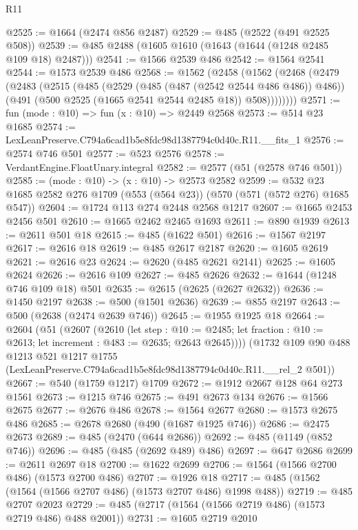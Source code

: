 \begin{lexlean}{R11}
\begin{coremodule}
@2525 := @1664 (@2474 @856 @2487)
@2529 := @485 (@2522 (@491 @2525 @508))
@2539 := @485 @2488 (@1605 @1610 (@1643 (@1644 (@1248 @2485 @109 @18) @2487)))
@2541 := @1566 @2539 @486
@2542 := @1564 @2541
@2544 := @1573 @2539 @486
@2568 := @1562
    (@2458
      (@1562
        (@2468
          (@2479
            (@2483
              (@2515
                (@485
                  (@2529 (@485 (@487 (@2542 @2544 @486 @486)) @486))
                  (@491 (@500 @2525 (@1665 @2541 @2544 @2485 @18)) @508))))))))
@2571 := fun (mode : @10) => fun (x : @10) => @2449 @2568
@2573 := @514 @23 @1685
@2574 := LexLeanPreserve.C794a6cad1b5e8fdc98d1387794c0d40c.R11.__fits_1
@2576 := @2574 @746 @501
@2577 := @523 @2576
@2578 := VerdantEngine.FloatUnary.integral
@2582 := @2577 (@51 (@2578 @746 @501))
@2585 := (mode : @10) -> (x : @10) -> @2573 @2582
@2599 := @532 @23 @1685 @2582 @276 @1709 (@553 (@564 @23)) (@570 (@571 (@572 @276) @1685 @547))
@2604 := @1724 @113 @274 @2448 @2568 @1217
@2607 := @1665 @2453 @2456 @501
@2610 := @1665 @2462 @2465 @1693
@2611 := @890 @1939
@2613 := @2611 @501 @18
@2615 := @485 (@1622 @501)
@2616 := @1567 @2197
@2617 := @2616 @18
@2619 := @485 @2617 @2187
@2620 := @1605 @2619
@2621 := @2616 @23
@2624 := @2620 (@485 @2621 @2141)
@2625 := @1605 @2624
@2626 := @2616 @109
@2627 := @485 @2626
@2632 := @1644 (@1248 @746 @109 @18) @501
@2635 := @2615 (@2625 (@2627 @2632))
@2636 := @1450 @2197
@2638 := @500 (@1501 @2636)
@2639 := @855 @2197
@2643 := @500 (@2638 (@2474 @2639 @746))
@2645 := @1955 @1925 @18
@2664 := @2604
    (@51
      (@2607
        (@2610
          (let step : @10 := @2485;
          let fraction : @10 := @2613; let increment : @483 := @2635; @2643 @2645))))
    (@1732
      @109
      @90
      @488
      @1213
      @521
      @1217
      @1755
      (LexLeanPreserve.C794a6cad1b5e8fdc98d1387794c0d40c.R11.__rel_2 @501))
@2667 := @540 (@1759 @1217) @1709
@2672 := @1912 @2667 @128 @64 @273 @1561
@2673 := @1215 @746
@2675 := @491 @2673 @134
@2676 := @1566 @2675
@2677 := @2676 @486
@2678 := @1564 @2677
@2680 := @1573 @2675 @486
@2685 := @2678 @2680 (@490 (@1687 @1925 @746))
@2686 := @2475 @2673
@2689 := @485 (@2470 (@644 @2686))
@2692 := @485 (@1149 (@852 @746))
@2696 := @485 (@485 (@2692 @489) @486)
@2697 := @647 @2686
@2699 := @2611 @2697 @18
@2700 := @1622 @2699
@2706 := @1564 (@1566 @2700 @486) (@1573 @2700 @486)
@2707 := @1926 @18
@2717 := @485 (@1562 (@1564 (@1566 @2707 @486) (@1573 @2707 @486) @1998 @488))
@2719 := @485 @2707 @2023
@2729 := @485 (@2717 (@1564 (@1566 @2719 @486) (@1573 @2719 @486) @488 @2001))
@2731 := @1605 @2719 @2010

\end{coremodule}
\end{lexlean}
